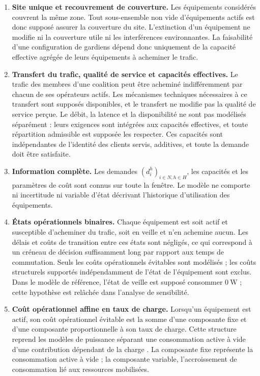 \begin{enumerate}
    \item \textbf{Site unique et recouvrement de couverture.}
    Les équipements considérés couvrent la même zone. Tout sous-ensemble
    non vide d'équipements actifs est donc supposé assurer la couverture
    du site. L'extinction d'un équipement ne modifie ni la couverture
    utile ni les interférences environnantes. La faisabilité d'une
    configuration de gardiens dépend donc uniquement de la capacité
    effective agrégée de leurs équipements à acheminer le trafic.

    \item \textbf{Transfert du trafic, qualité de service et capacités
    effectives.}
    Le trafic des membres d'une coalition peut être acheminé
    indifféremment par chacun de ses opérateurs actifs. Les mécanismes
    techniques nécessaires à ce transfert sont supposés disponibles, et le
    transfert ne modifie pas la qualité de service perçue. Le débit, la latence
    et la disponibilité ne sont pas modélisés séparément : leurs exigences
    sont intégrées aux capacités effectives, et toute répartition admissible
    est supposée les respecter. Ces capacités sont indépendantes de l'identité
    des clients servis, additives, et toute la demande doit être satisfaite.

    \item \textbf{Information complète.}
    Les demandes \((d_i^h)_{i\in N,h\in H}\), les capacités et les paramètres
    de coût sont connus sur toute la fenêtre. Le modèle ne comporte ni
    incertitude ni variable d'état décrivant l'historique d'utilisation des
    équipements.

    \item \textbf{États opérationnels binaires.}
    Chaque équipement est soit actif et susceptible d'acheminer du
    trafic, soit en veille et n'en achemine aucun. Les délais et coûts de
    transition entre ces états sont négligés, ce qui correspond à un
    créneau de décision suffisamment long par rapport aux temps de
    commutation. Seuls les coûts opérationnels évitables sont modélisés ;
    les coûts structurels supportés indépendamment de l'état de
    l'équipement sont exclus. Dans le modèle de référence, l'état de veille
    est supposé consommer \(0\ \mathrm{W}\) ; cette hypothèse est relâchée dans
    l'analyse de sensibilité.

    \item \textbf{Coût opérationnel affine en taux de charge.}
    Lorsqu'un équipement est actif, son coût opérationnel évitable est
    la somme d'une composante fixe et d'une composante proportionnelle à
    son taux de charge. Cette structure reprend les modèles de puissance
    séparant une consommation active à vide d'une contribution dépendant de
    la charge \cite{arnold2010,auer2011,lorincz2012}. La composante fixe
    représente la consommation active à vide ; la composante variable,
    l'accroissement de consommation lié aux ressources mobilisées.


\end{enumerate}

